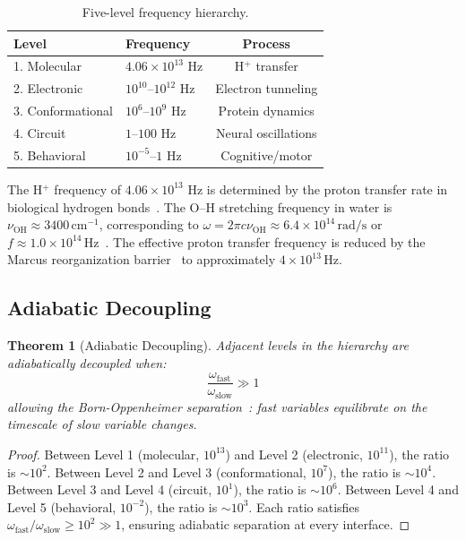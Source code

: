 \documentclass[10pt,twocolumn]{article}
\newtheorem{theorem}{Theorem}[section]
\theoremstyle{remark}
\begin{document}
\begin{table}[h]
\centering
\caption{Five-level frequency hierarchy.}
\label{tab:hierarchy}
\begin{tabular}{@{}llc@{}}
\toprule
Level & Frequency & Process \\
\midrule
1. Molecular & $4.06 \times 10^{13}$ Hz & H$^+$ transfer \\
2. Electronic & $10^{10}$--$10^{12}$ Hz & Electron tunneling \\
3. Conformational & $10^{6}$--$10^{9}$ Hz & Protein dynamics \\
4. Circuit & $1$--$100$ Hz & Neural oscillations \\
5. Behavioral & $10^{-5}$--$1$ Hz & Cognitive/motor \\
\bottomrule
\end{tabular}
\end{table}

The H$^+$ frequency of $4.06 \times 10^{13}$ Hz is determined by the proton transfer rate in biological hydrogen bonds~\cite{klinman2013hydrogen,mitchell1961coupling,wikstrom2015proton}. The O--H stretching frequency in water is $\nu_{\mathrm{OH}} \approx 3400\,\text{cm}^{-1}$, corresponding to $\omega = 2\pi c \nu_{\mathrm{OH}} \approx 6.4 \times 10^{14}\,\text{rad/s}$ or $f \approx 1.0 \times 10^{14}\,\text{Hz}$~\cite{herzberg1950spectra,huber1979constants}. The effective proton transfer frequency is reduced by the Marcus reorganization barrier~\cite{marcus1985electron} to approximately $4 \times 10^{13}\,\text{Hz}$.

\subsection{Adiabatic Decoupling}

\begin{theorem}[Adiabatic Decoupling]
\label{thm:adiabatic}
Adjacent levels in the hierarchy are adiabatically decoupled when:
\begin{equation}
\frac{\omega_{\mathrm{fast}}}{\omega_{\mathrm{slow}}} \gg 1
\end{equation}
allowing the Born-Oppenheimer separation~\cite{born1927quantentheorie}: fast variables equilibrate on the timescale of slow variable changes.
\end{theorem}

\begin{proof}
Between Level 1 (molecular, $10^{13}$) and Level 2 (electronic, $10^{11}$), the ratio is $\sim 10^2$. Between Level 2 and Level 3 (conformational, $10^7$), the ratio is $\sim 10^4$. Between Level 3 and Level 4 (circuit, $10^1$), the ratio is $\sim 10^6$. Between Level 4 and Level 5 (behavioral, $10^{-2}$), the ratio is $\sim 10^3$. Each ratio satisfies $\omega_{\mathrm{fast}}/\omega_{\mathrm{slow}} \geq 10^2 \gg 1$, ensuring adiabatic separation at every interface.
\end{proof}
\end{document}
